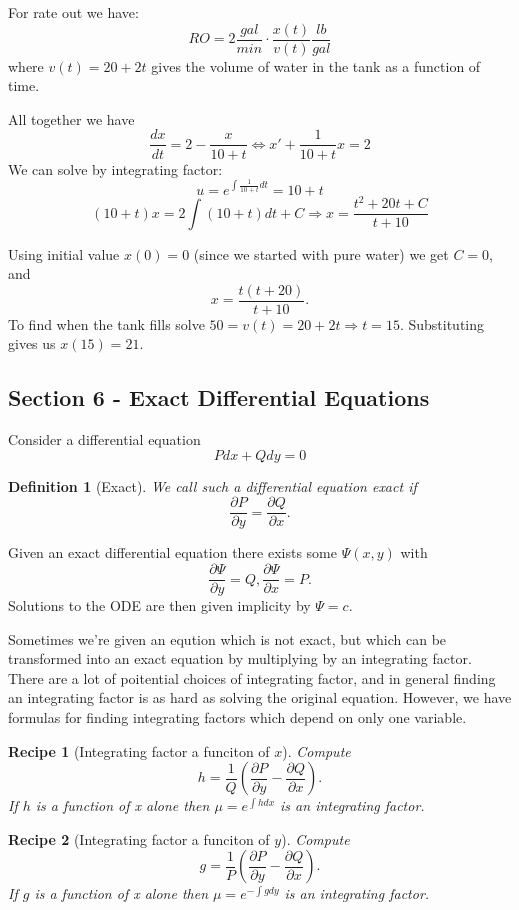 \documentclass[14pt]{article}
\newtheorem{defn}{Definition}
\newtheorem{re}{Recipe}
\begin{document}
For rate out we have:
\[RO = 2 \frac{gal}{min } \cdot \frac{x(t)}{v(t)} \frac{lb}{gal}\]
where $v(t) = 20 + 2t$ gives the volume of water in the tank as a function of time.

All together we have
\[\frac{dx}{dt} = 2 - \frac{x}{10 + t } \Leftrightarrow x' + \frac{1}{10 + t} x = 2\]
We can solve by integrating factor:
\[u = e^{\int \frac{1}{10 + t } dt } = 10 + t\]
\[(10 + t ) x = 2 \int (10 + t ) dt + C \Rightarrow x = \frac{t^2 + 20 t + C}{t + 10}\]

Using initial value $x(0) = 0$ (since we started with pure water) we get $C = 0$, and 
\[  x =   \frac{t(t  + 20)  }{t + 10}.\]
To find when the tank fills solve $50 = v(t) = 20  + 2 t  \Rightarrow t =15$. Substituting gives us $x(15) = 21$.




\subsection{Section 6 - Exact Differential Equations}


Consider a differential equation 
\[P dx + Q dy = 0\]
\begin{defn}[Exact]
We call such a differential equation \emph{exact} if 
\[\frac{\partial P }{\partial y} = \frac{\partial Q }{\partial x}.\]
\end{defn}
Given an exact differential equation there exists some $\Psi(x,y)$ with 
\[\frac{\partial \Psi}{\partial y} = Q, \frac{\partial \Psi}{\partial x} = P. \] 
Solutions to the ODE are then given implicity by $\Psi = c$.

Sometimes we're given an eqution which is not exact, but which can be transformed into an exact equation by multiplying by an integrating factor. 
There are a lot of poitential choices of integrating factor, and in general finding an integrating factor is as hard as solving the original equation. 
However, we have formulas for finding integrating factors which depend on only one variable.

\begin{re}[Integrating factor a funciton of $x$]
Compute
\[h = \frac{1}{Q} \left( \frac{\partial P }{ \partial y} - \frac{\partial Q}{ \partial x}\right).\]
If $h$ is a function of x alone then $\mu = e^{\int h dx}$ is an integrating factor.
\end{re}

\begin{re}[Integrating factor a funciton of $y$]
Compute
\[g = \frac{1}{P} \left( \frac{\partial P }{ \partial y} - \frac{\partial Q}{ \partial x}\right).\]
If $g$ is a function of x alone then $\mu = e^{-\int g dy}$ is an integrating factor.
\end{re}
\end{document}
